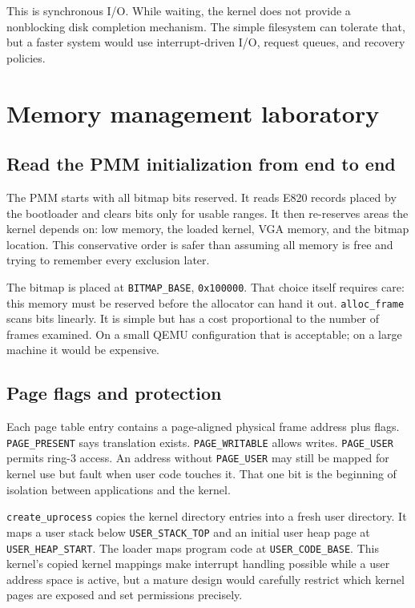 This is synchronous I/O. While waiting, the kernel does not provide a nonblocking disk completion mechanism. The simple filesystem can tolerate that, but a faster system would use interrupt-driven I/O, request queues, and recovery policies.


\chapter{Memory management laboratory}
\section{Read the PMM initialization from end to end}
The PMM starts with all bitmap bits reserved. It reads E820 records placed by the bootloader and clears bits only for usable ranges. It then re-reserves areas the kernel depends on: low memory, the loaded kernel, VGA memory, and the bitmap location. This conservative order is safer than assuming all memory is free and trying to remember every exclusion later.

The bitmap is placed at \texttt{BITMAP\_BASE}, \texttt{0x100000}. That choice itself requires care: this memory must be reserved before the allocator can hand it out. \texttt{alloc\_frame} scans bits linearly. It is simple but has a cost proportional to the number of frames examined. On a small QEMU configuration that is acceptable; on a large machine it would be expensive.

\section{Page flags and protection}
Each page table entry contains a page-aligned physical frame address plus flags. \texttt{PAGE\_PRESENT} says translation exists. \texttt{PAGE\_WRITABLE} allows writes. \texttt{PAGE\_USER} permits ring-3 access. An address without \texttt{PAGE\_USER} may still be mapped for kernel use but fault when user code touches it. That one bit is the beginning of isolation between applications and the kernel.

\texttt{create\_uprocess} copies the kernel directory entries into a fresh user directory. It maps a user stack below \texttt{USER\_STACK\_TOP} and an initial user heap page at \texttt{USER\_HEAP\_START}. The loader maps program code at \texttt{USER\_CODE\_BASE}. This kernel's copied kernel mappings make interrupt handling possible while a user address space is active, but a mature design would carefully restrict which kernel pages are exposed and set permissions precisely.

